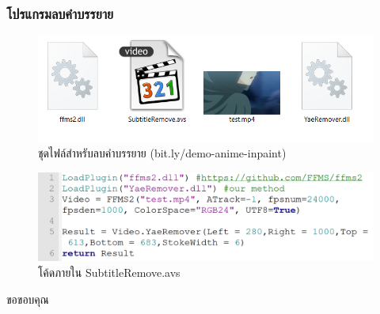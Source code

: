 \documentclass[xcolor=dvipsnames, xetex,serif]{beamer}
\numberwithin{equation}{section}
\begin{document}
	\begin{frame}
		\frametitle{โปรแกรมลบคำบรรยาย}
		\begin{figure}
			\includegraphics[width=0.8\linewidth]{images/demo_anime/file.png}
			\caption{ชุดไฟล์สำหรับลบคำบรรยาย (bit.ly/demo-anime-inpaint)}
		\end{figure}
		\begin{figure}
			\includegraphics[width=0.8\linewidth]{images/demo_anime/notepad.png}
			\caption{โค้ดภายใน SubtitleRemove.avs}
		\end{figure}
	\end{frame}
	\begin{frame}
		\centering
		\Huge{ขอขอบคุณ}
	\end{frame}
\end{document}
